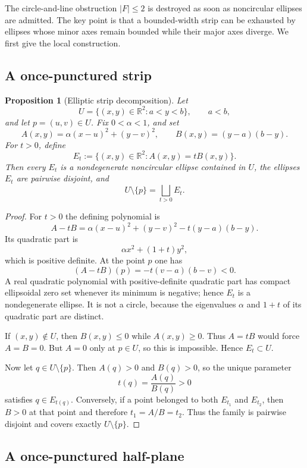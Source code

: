\documentclass[11pt]{article}
\newtheorem{proposition}[theorem]{Proposition}
\newcommand{\R}{\mathbb{R}}
\begin{document}
The circle-and-line obstruction $|F|\le2$ is destroyed as soon as noncircular ellipses are admitted. The key point is that a bounded-width strip can be exhausted by ellipses whose minor axes remain bounded while their major axes diverge. We first give the local construction.

\subsection{A once-punctured strip}

\begin{proposition}[Elliptic strip decomposition]\label{prop:elliptic-strip}
Let
\[
U=\{(x,y)\in\R^2:a<y<b\},\qquad a<b,
\]
and let $p=(u,v)\in U$. Fix $0<\alpha<1$, and set
\[
A(x,y)=\alpha(x-u)^2+(y-v)^2,
\qquad
B(x,y)=(y-a)(b-y).
\]
For $t>0$, define
\[
E_t:=\{(x,y)\in\R^2:A(x,y)=tB(x,y)\}.
\]
Then every $E_t$ is a nondegenerate noncircular ellipse contained in $U$, the ellipses $E_t$ are pairwise disjoint, and
\[
U\setminus\{p\}=\bigsqcup_{t>0}E_t.
\]
\end{proposition}

\begin{proof}
For $t>0$ the defining polynomial is
\[
A-tB
=\alpha(x-u)^2+(y-v)^2-t(y-a)(b-y).
\]
Its quadratic part is
\[
\alpha x^2+(1+t)y^2,
\]
which is positive definite. At the point $p$ one has
\[
(A-tB)(p)=-t(v-a)(b-v)<0.
\]
A real quadratic polynomial with positive-definite quadratic part has compact ellipsoidal zero set whenever its minimum is negative; hence $E_t$ is a nondegenerate ellipse. It is not a circle, because the eigenvalues $\alpha$ and $1+t$ of its quadratic part are distinct.

If $(x,y)\notin U$, then $B(x,y)\le0$ while $A(x,y)\ge0$. Thus $A=tB$ would force $A=B=0$. But $A=0$ only at $p\in U$, so this is impossible. Hence $E_t\subset U$.

Now let $q\in U\setminus\{p\}$. Then $A(q)>0$ and $B(q)>0$, so the unique parameter
\[
t(q)=\frac{A(q)}{B(q)}>0
\]
satisfies $q\in E_{t(q)}$. Conversely, if a point belonged to both $E_{t_1}$ and $E_{t_2}$, then $B>0$ at that point and therefore $t_1=A/B=t_2$. Thus the family is pairwise disjoint and covers exactly $U\setminus\{p\}$.
\end{proof}

\subsection{A once-punctured half-plane}
\end{document}
